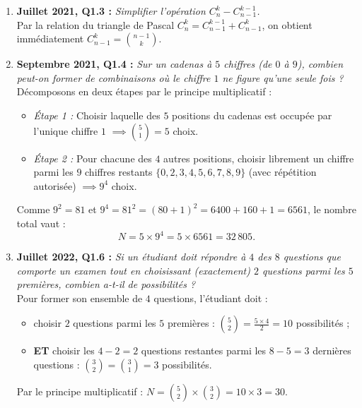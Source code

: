 \begin{exemple}
\begin{enumerate}
    \item \textbf{Juillet 2021, Q1.3 :} \emph{Simplifier l'opération $C_n^k - C_{n-1}^{k-1}$.}\\
    Par la relation du triangle de Pascal $C_n^k = C_{n-1}^{k-1} + C_{n-1}^k$, on obtient immédiatement $\boxed{C_{n-1}^k = \binom{n-1}{k}}$.

    \item \textbf{Septembre 2021, Q1.4 :} \emph{Sur un cadenas à $5$ chiffres (de $0$ à $9$), combien peut-on former de combinaisons où le chiffre $1$ ne figure qu'une seule fois ?}\\
    Décomposons en deux étapes par le principe multiplicatif :
    \begin{itemize}
        \item \emph{Étape 1 :} Choisir laquelle des $5$ positions du cadenas est occupée par l'unique chiffre $1$ $\implies \binom{5}{1} = 5$ choix.
        \item \emph{Étape 2 :} Pour chacune des $4$ autres positions, choisir librement un chiffre parmi les $9$ chiffres restants $\{0, 2, 3, 4, 5, 6, 7, 8, 9\}$ (avec répétition autorisée) $\implies 9^4$ choix.
    \end{itemize}
    Comme $9^2 = 81$ et $9^4 = 81^2 = (80 + 1)^2 = 6400 + 160 + 1 = 6561$, le nombre total vaut :
    \[
        N = 5 \times 9^4 = 5 \times 6561 = \boxed{32\,805}.
    \]

    \item \textbf{Juillet 2022, Q1.6 :} \emph{Si un étudiant doit répondre à $4$ des $8$ questions que comporte un examen tout en choisissant (exactement) $2$ questions parmi les $5$ premières, combien a-t-il de possibilités ?}\\
    Pour former son ensemble de $4$ questions, l'étudiant doit :
    \begin{itemize}
        \item choisir $2$ questions parmi les $5$ premières : $\binom{5}{2} = \frac{5 \times 4}{2} = 10$ possibilités ;
        \item \textbf{ET} choisir les $4 - 2 = 2$ questions restantes parmi les $8 - 5 = 3$ dernières questions : $\binom{3}{2} = \binom{3}{1} = 3$ possibilités.
    \end{itemize}
    Par le principe multiplicatif : $N = \binom{5}{2} \times \binom{3}{2} = 10 \times 3 = \boxed{30}$.


\end{enumerate}
\end{exemple}
